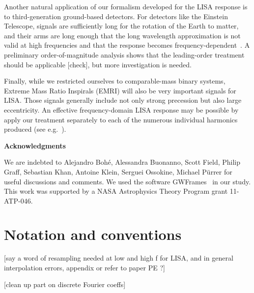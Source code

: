 \documentclass[aps,showpacs,twocolumn,
prd,superscriptaddress,nofootinbib]{revtex4-1}
\newcommand{\SM}[1]{{\color{Red} #1}}
\newcommand{\jgb}[1]{{\color{DarkGreen} #1}}
\begin{document}
\jgb{Another natural application of our formalism developed for the LISA response is to third-generation ground-based detectors. For detectors like the Einstein Telescope,} signals are sufficiently long for the rotation of the Earth to matter, and their arms are long enough that the long wavelength approximation is not valid at high frequencies and that the response becomes frequency-dependent~\cite{Essick+17}. A preliminary order-of-magnitude analysis shows that the leading-order treatment should be applicable \SM{[check]}, \jgb{but more investigation is needed.}

\jgb{Finally, while we restricted ourselves to comparable-mass binary systems, Extreme Mass Ratio Inspirals (EMRI) will also be very important signals for LISA. Those signals generally include not only strong precession but also large eccentricity. An effective frequency-domain LISA response may be possible by apply our treatment separately to each of the numerous individual harmonics produced (see e.g.~\cite{Chua+17}).}
 


\vspace{4.5mm}

\hspace{0.85in}
{\bf Acknowledgments}

\vspace{3.5mm}

We are indebted to Alejandro Boh\'{e}, Alessandra Buonanno, Scott Field, Philip Graff, Sebastian Khan, Antoine Klein, Serguei Ossokine, Michael P\"{u}rrer for useful discussions and comments. We used the software GWFrames~\cite{Boyle13, Boyle+14} in our study. This work was supported by a NASA Astrophysics Theory Program grant 11-ATP-046.


\appendix

\section{Notation and conventions}
\label{app:notation}

\SM{[say a word of resampling needed at low and high f for LISA, and in general interpolation errors, appendix or refer to paper PE ?]}

\SM{[clean up part on discrete Fourier coeffs]}
\end{document}
